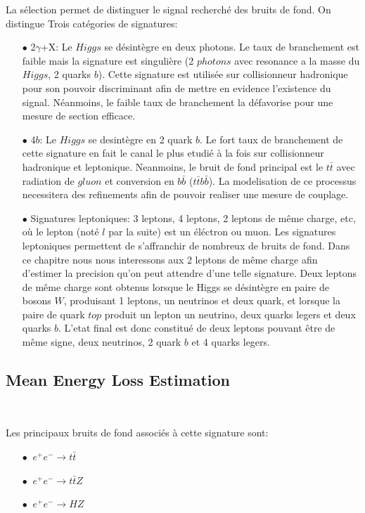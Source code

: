 La s\'election permet de distinguer le signal recherch\'e des bruits de fond. On distingue Trois catégories de signatures:
\begin{itemize}
\item[$\bullet$] 2$\gamma$+X:  Le $Higgs$ se désintègre en deux photons. Le taux de branchement est faible mais la signature est singulière (2 $photons$ avec resonance a la masse du $Higgs$, 2 quarks $b$). Cette signature est utilisée sur collisionneur hadronique pour son pouvoir discriminant afin de mettre en evidence l'existence du signal. Néanmoins, le faible taux de branchement la défavorise pour une mesure de section efficace.\\

\item[$\bullet$] 4$b$: Le $Higgs$ se desintègre en 2 quark $b$. Le fort taux de branchement de cette signature en fait le canal le plus etudié à la fois sur collisionneur hadronique et leptonique. Neanmoins, le bruit de fond principal est le $t\bar{t}$ avec radiation de $gluon$ et conversion en $b\bar{b}$ ($t\bar{t}b\bar{b}$). La modelisation de ce processus necessitera des refinements afin de pouvoir realiser une mesure de couplage.\\

\item[$\bullet$] Signatures leptoniques: 3 leptons, 4 leptons, 2 leptons de même charge,  etc, o\`u le lepton (not\'e $l$ par la suite) est un \'el\'ectron ou muon. Les signatures leptoniques permettent de s'affranchir de nombreux de bruits de fond. Dans ce chapitre nous nous interessons aux 2 leptons de même charge afin d'estimer la precision qu'on peut attendre d'une telle signature.
Deux leptons de même charge sont obtenus lorsque le Higgs se désintègre en paire de bosons $W$, produisant 1 leptons, un neutrinos et deux quark, et lorsque la paire de quark $top$ produit un lepton un neutrino, deux quarks legers et deux quarks $b$. L'etat final est donc constitué de deux leptons pouvant être de même signe, deux neutrinos, 2 quark $b$ et 4 quarks legers.
\end{itemize}

\subsection{Mean Energy Loss Estimation}

~\par Les principaux bruits de fond associés \`a cette signature sont:
\begin{itemize}
\item[$\bullet$] $\ e^+e^-{\rightarrow}t\bar{t}$
\item[$\bullet$] $\ e^+e^-{\rightarrow}t\bar{t}Z$
\item[$\bullet$] $\ e^+e^-{\rightarrow}HZ$   
\end{itemize}

